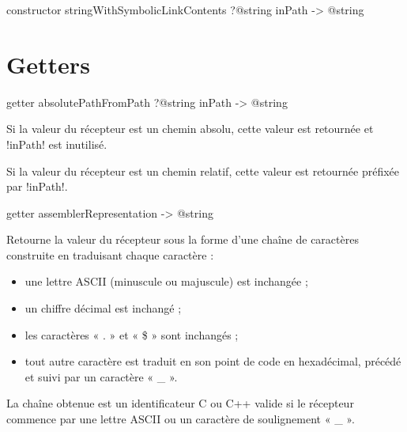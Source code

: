 
\begin{galgasbox}
constructor stringWithSymbolicLinkContents ?@string inPath -> @string
\end{galgasbox}



















\section{Getters}


\begin{galgasbox}
getter absolutePathFromPath ?@string inPath -> @string
\end{galgasbox}

Si la valeur du récepteur est un chemin absolu, cette valeur est retournée et \ggs!inPath! est inutilisé.

Si la valeur du récepteur est un chemin relatif, cette valeur est retournée préfixée par \ggs!inPath!.





\begin{galgasbox}
getter assemblerRepresentation -> @string
\end{galgasbox}

Retourne la valeur du récepteur sous la forme d'une chaîne de caractères construite en traduisant chaque caractère :
\begin{itemize}
\item une lettre ASCII (minuscule ou majuscule) est inchangée ;
\item un chiffre décimal est inchangé ;
\item les caractères « . » et  « \$ » sont inchangés ;
\item tout autre caractère est traduit en son point de code en hexadécimal, précédé et suivi par un caractère « \_ ».
\end{itemize}

La chaîne obtenue est un identificateur C ou C++ valide si le récepteur commence par une lettre ASCII ou un caractère de soulignement « \_ ».

